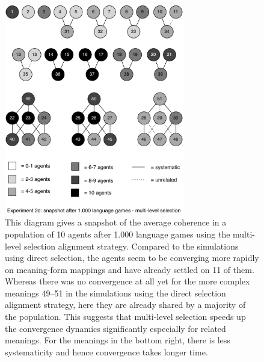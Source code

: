 \begin{figure}[p]
\centerline{\includegraphics[width=0.7\textwidth]{Chapter4/figs/multilevel-coherence-no-analogy-1000}}
  \caption[Experiment 2: snapshot after 1.000 games (multi-level selection)]{This diagram gives a snapshot of the average coherence in a population of 10 agents after 1.000 language games using the multi-level selection alignment strategy. Compared to the simulations using direct selection, the agents seem to be converging more rapidly on meaning-form mappings and have already settled on 11 of them. Whereas there was no convergence at all yet for the more complex meanings 49--51 in the simulations using the direct selection alignment strategy, here they are already shared by a majority of the population. This suggests that multi-level selection speeds up the convergence dynamics significantly especially for related meanings. For the meanings in the bottom right, there is less systematicity and hence convergence takes longer time.}
   \label{f:2d-coherence-1000}
\end{figure}

